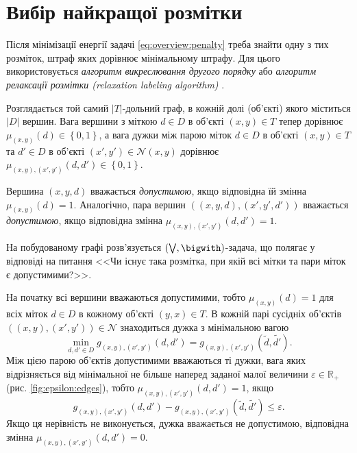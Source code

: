 \section{Вибір найкращої розмітки}

Після мінімізації енергії задачі \eqref{eq:overview:penalty}
треба знайти одну з тих розміток, штраф яких дорівнює мінімальному штрафу.
Для цього використовується
\textit{алгоритм викреслювання другого порядку} або
\textit{алгоритм релаксації розмітки (relaxation labeling algorithm)}
\cite{overview:savchynskyy:diffusion}.

Розглядається той самий $\left| T \right|$-дольний граф,
в кожній долі (об'єкті) якого міститься $\left| D \right|$ вершин.
Вага вершини з міткою $d \in D$ в об'єкті $\left(x, y \right) \in T$
тепер дорівнює
$\mu_{\left(x, y \right)} \left( d \right) \in \left\{ 0, 1 \right\}$,
а вага дужки між парою міток $d \in D$ в об'єкті $\left( x, y \right) \in T$
та $d' \in D$ в об'єкті
$\left(x', y' \right) \in \mathcal{N} \left(x, y \right)$ дорівнює
$\mu_{\left(x, y \right), \left(x', y' \right)} \left(d, d' \right) \in
    \left\{ 0, 1 \right\}$.

Вершина $\left(x, y, d \right)$ вважається \textit{допустимою},
якщо відповідна їй змінна $\mu_{\left(x, y \right)} \left( d \right) = 1$.
Аналогічно,
пара вершин $\left( \left( x, y, d \right), \left(x', y', d' \right) \right)$
вважається \textit{допустимою}, якщо відповідна змінна
$\mu_{\left(x, y \right), \left(x', y' \right)} \left(d, d' \right) = 1$.

На побудованому графі розв'язується
$\left( \bigvee, \bigwith \right)$-задача, що полягає у відповіді на питання
<<Чи існує така розмітка, при якій всі мітки та пари міток є допустимими?>>.

На початку всі вершини вважаються допустимими, тобто
$\mu_{\left(x, y \right)} \left(d \right) = 1$ для всіх
міток $d \in D$ в кожному об'єкті $\left(y,x \right) \in T$.
В кожній парі сусідніх об'єктів
$\left( \left(x, y \right), \left(x', y' \right) \right) \in \mathcal{N}$
знаходиться дужка з мінімальною вагою
\begin{equation*}
\min \limits_{d, d' \in D} g_{\left(x, y \right), \left(x', y' \right)}
    \left(d, d' \right) =
    g_{\left(x, y \right), \left(x', y' \right)}
        \left(\tilde{d}, \tilde{d'} \right).
\end{equation*}
Між цією парою об'єктів допустимими вважаються ті дужки,
вага яких відрізняється від мінімальної не більше
наперед заданої малої величини $\varepsilon \in \mathbb{R}_+$
(рис. \ref{fig:epsilon:edges}), тобто
$\mu_{\left(x, y \right), \left(x', y' \right)} \left(d, d' \right) = 1$,
якщо
\begin{equation*}
    g_{\left(x, y \right), \left(x', y' \right)} \left(d, d' \right) -
    g_{\left(x, y \right), \left(x', y' \right)}
        \left(\tilde{d}, \tilde{d'} \right) \le
    \varepsilon.
\end{equation*}
Якщо ця нерівність не виконується, дужка вважається не допустимою,
відповідна змінна
$\mu_{\left(x, y \right), \left(x', y' \right)} \left(d, d' \right) = 0$.

